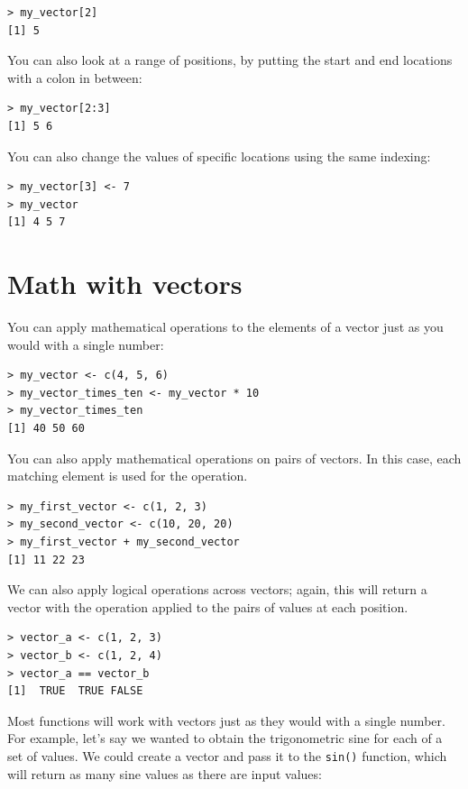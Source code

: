\documentclass[12pt,]{book}
\begin{document}
\begin{verbatim}
> my_vector[2]
[1] 5
\end{verbatim}

You can also look at a range of positions, by putting the start and end locations with a colon in between:

\begin{verbatim}
> my_vector[2:3]
[1] 5 6
\end{verbatim}

You can also change the values of specific locations using the same indexing:

\begin{verbatim}
> my_vector[3] <- 7
> my_vector
[1] 4 5 7
\end{verbatim}

\hypertarget{math-with-vectors}{%
\section{Math with vectors}\label{math-with-vectors}}

You can apply mathematical operations to the elements of a vector just as you would with a single number:

\begin{verbatim}
> my_vector <- c(4, 5, 6)
> my_vector_times_ten <- my_vector * 10
> my_vector_times_ten
[1] 40 50 60
\end{verbatim}

You can also apply mathematical operations on pairs of vectors. In this case, each matching element is used for the operation.

\begin{verbatim}
> my_first_vector <- c(1, 2, 3)
> my_second_vector <- c(10, 20, 20)
> my_first_vector + my_second_vector
[1] 11 22 23
\end{verbatim}

We can also apply logical operations across vectors; again, this will return a vector with the operation applied to the pairs of values at each position.

\begin{verbatim}
> vector_a <- c(1, 2, 3)
> vector_b <- c(1, 2, 4)
> vector_a == vector_b
[1]  TRUE  TRUE FALSE

\end{verbatim}

Most functions will work with vectors just as they would with a single number. For example, let's say we wanted to obtain the trigonometric sine for each of a set of values. We could create a vector and pass it to the \texttt{sin()} function, which will return as many sine values as there are input values:
\end{document}
